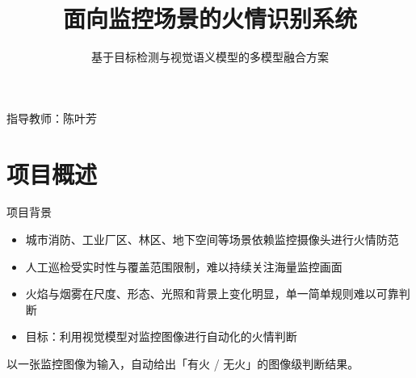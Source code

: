 \documentclass{beamer}
\author{\ProjectAuthor}
\institute{\ProjectInstitute}
\title{面向监控场景的火情识别系统}
\subtitle{基于目标检测与视觉语义模型的多模型融合方案}
\newcommand{\ProjectAdvisor}{陈叶芳}
\begin{document}
\begin{frame}[plain]
  \titlepage
  \vspace{-0.6em}
  \begin{center}
    \footnotesize 指导教师：\ProjectAdvisor
  \end{center}
\end{frame}

\section{项目概述}
\begin{frame}{项目背景}
  \begin{itemize}
    \item 城市消防、工业厂区、林区、地下空间等场景依赖监控摄像头进行火情防范
    \item 人工巡检受实时性与覆盖范围限制，难以持续关注海量监控画面
    \item 火焰与烟雾在尺度、形态、光照和背景上变化明显，单一简单规则难以可靠判断
    \item 目标：利用视觉模型对监控图像进行自动化的火情判断
  \end{itemize}
  \begin{block}{}
    \small 以一张监控图像为输入，自动给出「有火 / 无火」的图像级判断结果。
  \end{block}
\end{frame}
\end{document}
